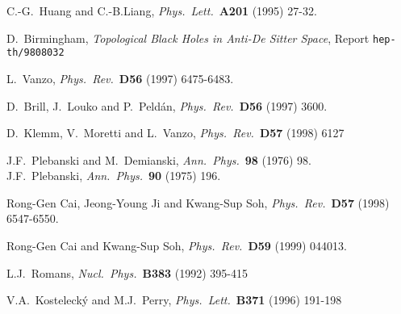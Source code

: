 \documentclass[12pt,a4paper]{article}
\begin{document}
\begin{thebibliography}{99}
 C.-G.~Huang and  C.-B.Liang,
                 {\it Phys.~Lett.}~{\bf A201} (1995) 27-32. 

 D.~Birmingham,
                 {\sl Topological Black Holes in Anti-De Sitter Space},
                 Report 
                 {\tt hep-th/9808032}

 L.~Vanzo,
                 {\it Phys.~Rev.}~{\bf D56} (1997) 6475-6483.

 D.~Brill, J.~Louko and P.~Peld\'an,
                  {\it Phys.~Rev.}~{\bf D56} (1997) 3600.

 D.~Klemm, V.~Moretti and L.~Vanzo,
                  {\it Phys.~Rev.}~{\bf D57} (1998) 6127

 J.F.~Plebanski and M.~Demianski,
                 {\it Ann.~Phys.}~{\bf 98} (1976) 98.\\
% 
                 J.F.~Plebanski,
                 {\it Ann.~Phys.}~{\bf 90} (1975) 196.

 Rong-Gen Cai, Jeong-Young Ji and Kwang-Sup Soh,
                  {\it Phys.~Rev.}~{\bf D57} (1998) 6547-6550.

 Rong-Gen Cai and Kwang-Sup Soh,
                  {\it Phys.~Rev.}~{\bf D59} (1999) 044013.

 L.J.~Romans,
                 {\it Nucl.~Phys.}~{\bf B383} (1992) 395-415

 V.A.~Kosteleck\'y and M.J.~Perry,
                 {\it Phys.~Lett.}~{\bf B371} (1996) 191-198


\end{thebibliography}
\end{document}
